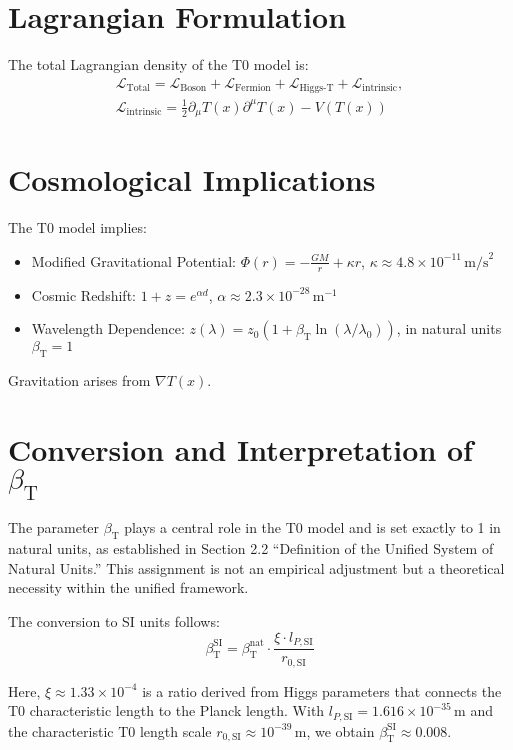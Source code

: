 \documentclass[a4paper,12pt]{article}
\newcommand{\Tfield}{T(x)}
\newcommand{\betaT}{\beta_{\text{T}}}
\begin{document}
	\section{Lagrangian Formulation}
	The total Lagrangian density of the T0 model is:
	\begin{multline}
		\mathcal{L}_{\text{Total}} = \mathcal{L}_{\text{Boson}} + \mathcal{L}_{\text{Fermion}} + \mathcal{L}_{\text{Higgs-T}} + \mathcal{L}_{\text{intrinsic}}, \\
		\mathcal{L}_{\text{intrinsic}} = \frac{1}{2} \partial_\mu \Tfield \partial^\mu \Tfield - V(\Tfield)
	\end{multline}
	
	\section{Cosmological Implications}
	The T0 model implies:
	\begin{itemize}
		\item Modified Gravitational Potential: \( \Phi(r) = -\frac{GM}{r} + \kappa r \), \( \kappa \approx 4.8 \times 10^{-11} \, \text{m/s}^2 \)
		\item Cosmic Redshift: \( 1 + z = e^{\alpha d} \), \( \alpha \approx 2.3 \times 10^{-28} \, \text{m}^{-1} \)
		\item Wavelength Dependence: \( z(\lambda) = z_0 (1 + \betaT \ln(\lambda/\lambda_0)) \), in natural units \(\betaT = 1\)
	\end{itemize}
	Gravitation arises from \( \nabla \Tfield \).
	
\section{Conversion and Interpretation of \(\betaT\)}
\label{subsec:beta_conversion_interpretation}

The parameter \(\betaT\) plays a central role in the T0 model and is set exactly to 1 in natural units, as established in Section 2.2 ``Definition of the Unified System of Natural Units.'' This assignment is not an empirical adjustment but a theoretical necessity within the unified framework.

The conversion to SI units follows:
\begin{equation}
	\betaT^{\text{SI}} = \betaT^{\text{nat}} \cdot \frac{\xi \cdot l_{P,\text{SI}}}{r_{0,\text{SI}}}
\end{equation}

Here, \(\xi \approx 1.33 \times 10^{-4}\) is a ratio derived from Higgs parameters that connects the T0 characteristic length to the Planck length. With \(l_{P,\text{SI}} = 1.616 \times 10^{-35} \, \text{m}\) and the characteristic T0 length scale \(r_{0,\text{SI}} \approx 10^{-39} \, \text{m}\), we obtain \(\betaT^{\text{SI}} \approx 0.008\).
\end{document}
